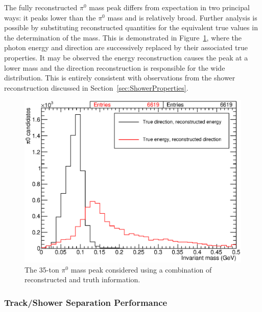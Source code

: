 The fully reconstructed $\pi^0$ mass peak differs from expectation in two principal ways: it peaks lower than the $\pi^0$ mass and is relatively broad.  Further analysis is possible by substituting reconstructed quantities for the equivalent true values in the determination of the mass.  This is demonstrated in Figure~\ref{fig:Pi0MassPeakTruth}, where the photon energy and direction are successively replaced by their associated true properties.  It may be observed the energy reconstruction causes the peak at a lower mass and the direction reconstruction is responsible for the wide distribution.  This is entirely consistent with observations from the shower reconstruction discussed in Section~\ref{sec:ShowerProperties}.

\begin{figure}
  \centering
  \includegraphics[width=12cm]{Pi0MassPeakTruth.eps}
  \caption[The 35-ton $\pi^0$ mass peak considered using a combination of reconstructed and truth information.]{The 35-ton $\pi^0$ mass peak considered using a combination of reconstructed and truth information.}
  \label{fig:Pi0MassPeakTruth}
\end{figure}

\subsubsection{Track/Shower Separation Performance}\label{sec:TrackShowerPerformance}


